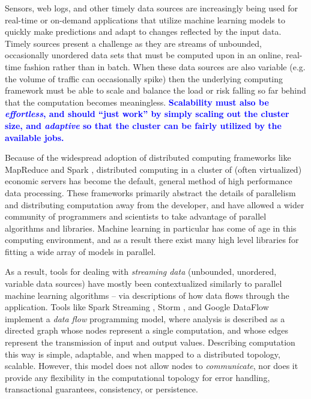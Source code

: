\documentclass[conference,twocolumn,11pt]{IEEEtran}
\newcommand{\kostasnote}[1]{\textcolor{blue}{\bf #1}}
\begin{document}
Sensors, web logs, and other timely data sources are increasingly being used for  real-time or on-demand applications that utilize machine learning models to quickly make predictions and adapt to changes reflected by the input data. Timely sources present a challenge as they are streams of unbounded, occasionally unordered data sets that must be computed upon in an online, real-time fashion rather than in batch. When these data sources are also variable (e.g. the volume of traffic can occasionally spike) then the underlying computing framework must be able to scale and balance the load or risk falling so far behind that the computation becomes meaningless. \kostasnote{Scalability must also be \textit{effortless}, and should ``just work'' by simply scaling out the cluster size, and \textit{adaptive} so that the cluster can be fairly utilized by the available jobs.}

Because of the widespread adoption of distributed computing frameworks like MapReduce \cite{dean_mapreduce:_2008} and Spark \cite{zaharia_resilient_2012}, distributed computing in a cluster of (often virtualized) economic servers has become the default, general method of high performance data processing. These frameworks primarily abstract the details of parallelism and distributing computation away from the developer, and have allowed a wider community of programmers and scientists to take advantage of parallel algorithms and libraries. Machine learning in particular has come of age in this computing environment, and as a result there exist many high level libraries for fitting a wide array of models in parallel.

As a result, tools for dealing with \textit{streaming data} (unbounded, unordered, variable data sources) have mostly been contextualized similarly to parallel machine learning algorithms -- via descriptions of how data flows through the application. Tools like Spark Streaming \cite{zaharia_discretized_2012}, Storm \cite{toshniwal_storm_2014}, and Google DataFlow \cite{akidau_dataflow_2015} implement a \textit{data flow} programming model, where analysis is described as a directed graph whose nodes represent a single computation, and whose edges represent the transmission of input and output values. Describing computation this way is simple, adaptable, and when mapped to a distributed topology, scalable. However, this model does not allow nodes to \textit{communicate}, nor does it provide any flexibility in the computational topology for error handling, transactional guarantees, consistency, or persistence.
\end{document}

